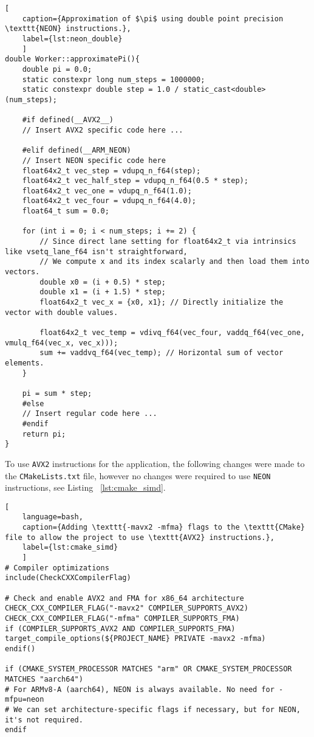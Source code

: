 \begin{lstlisting}[
	caption={Approximation of $\pi$ using double point precision \texttt{NEON} instructions.},
	label={lst:neon_double}
	]
double Worker::approximatePi(){
	double pi = 0.0;
	static constexpr long num_steps = 1000000;
	static constexpr double step = 1.0 / static_cast<double>(num_steps);
	
	#if defined(__AVX2__)
	// Insert AVX2 specific code here ...
	
	#elif defined(__ARM_NEON)
	// Insert NEON specific code here
	float64x2_t vec_step = vdupq_n_f64(step);
	float64x2_t vec_half_step = vdupq_n_f64(0.5 * step);
	float64x2_t vec_one = vdupq_n_f64(1.0);
	float64x2_t vec_four = vdupq_n_f64(4.0);
	float64_t sum = 0.0;
	
	for (int i = 0; i < num_steps; i += 2) {
		// Since direct lane setting for float64x2_t via intrinsics like vsetq_lane_f64 isn't straightforward,
		// We compute x and its index scalarly and then load them into vectors.
		double x0 = (i + 0.5) * step;
		double x1 = (i + 1.5) * step;
		float64x2_t vec_x = {x0, x1}; // Directly initialize the vector with double values.
		
		float64x2_t vec_temp = vdivq_f64(vec_four, vaddq_f64(vec_one, vmulq_f64(vec_x, vec_x)));
		sum += vaddvq_f64(vec_temp); // Horizontal sum of vector elements.
	}
	
	pi = sum * step;
	#else
	// Insert regular code here ...
	#endif
	return pi;
}
\end{lstlisting}

To use \texttt{AVX2} instructions for the application, the following changes were made to the \texttt{CMakeLists.txt} file, however no changes were required to use \texttt{NEON} instructions, see Listing ~\ref{lst:cmake_simd}.

\begin{lstlisting}[
	language=bash,
	caption={Adding \texttt{-mavx2 -mfma} flags to the \texttt{CMake} file to allow the project to use \texttt{AVX2} instructions.},
	label={lst:cmake_simd}
	]
# Compiler optimizations
include(CheckCXXCompilerFlag)

# Check and enable AVX2 and FMA for x86_64 architecture
CHECK_CXX_COMPILER_FLAG("-mavx2" COMPILER_SUPPORTS_AVX2)
CHECK_CXX_COMPILER_FLAG("-mfma" COMPILER_SUPPORTS_FMA)
if (COMPILER_SUPPORTS_AVX2 AND COMPILER_SUPPORTS_FMA)
target_compile_options(${PROJECT_NAME} PRIVATE -mavx2 -mfma)
endif()

if (CMAKE_SYSTEM_PROCESSOR MATCHES "arm" OR CMAKE_SYSTEM_PROCESSOR MATCHES "aarch64")
# For ARMv8-A (aarch64), NEON is always available. No need for -mfpu=neon
# We can set architecture-specific flags if necessary, but for NEON, it's not required.
endif
\end{lstlisting}

